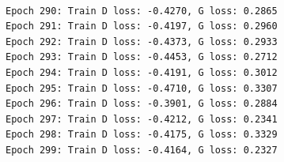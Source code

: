 \documentclass[11pt]{article}
\begin{document}
    \begin{center}
    \end{center}
    { \hspace*{\fill} \\}
    
    \begin{Verbatim}[commandchars=\\\{\}]
Epoch 290: Train D loss: -0.4270, G loss: 0.2865
Epoch 291: Train D loss: -0.4197, G loss: 0.2960
Epoch 292: Train D loss: -0.4373, G loss: 0.2933
Epoch 293: Train D loss: -0.4453, G loss: 0.2712
Epoch 294: Train D loss: -0.4191, G loss: 0.3012
Epoch 295: Train D loss: -0.4710, G loss: 0.3307
Epoch 296: Train D loss: -0.3901, G loss: 0.2884
Epoch 297: Train D loss: -0.4212, G loss: 0.2341
Epoch 298: Train D loss: -0.4175, G loss: 0.3329
Epoch 299: Train D loss: -0.4164, G loss: 0.2327

    \end{Verbatim}

    \begin{center}
    \end{center}
    { \hspace*{\fill} \\}
    
    \begin{center}
    \end{center}
    { \hspace*{\fill} \\}
    
\end{document}
